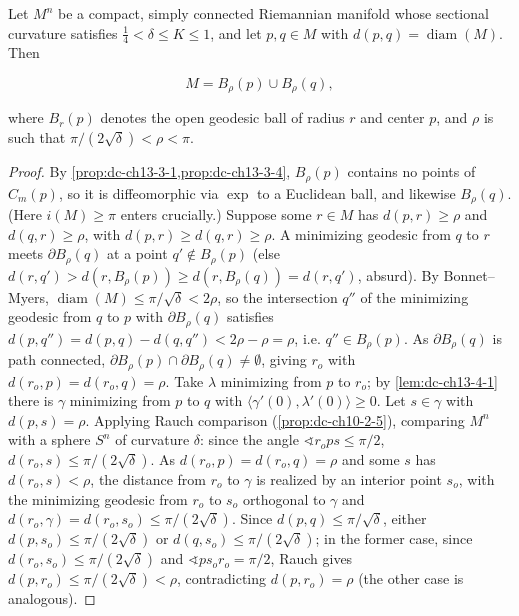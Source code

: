\begin{lemma}
  \label{lem:dc-ch13-4-2}
  Let $M^n$ be a compact, simply connected Riemannian manifold whose sectional
  curvature satisfies $\tfrac14<\delta\leq K\leq 1$, and let $p,q\in M$ with
  $d(p,q)=\operatorname{diam}(M)$. Then

  $$
  M=B_\rho(p)\cup B_\rho(q),
  $$

  where $B_r(p)$ denotes the open geodesic ball of radius $r$ and center $p$, and
  $\rho$ is such that $\pi/(2\sqrt\delta)<\rho<\pi$.
\end{lemma}
\begin{proof}
\sketch
  By \cref{prop:dc-ch13-3-1,prop:dc-ch13-3-4}, $B_\rho(p)$ contains no
  points of $C_m(p)$, so it is diffeomorphic via $\exp$ to a Euclidean ball, and
  likewise $B_\rho(q)$. (Here $i(M)\geq\pi$ enters crucially.) Suppose some $r\in M$
  has $d(p,r)\geq\rho$ and $d(q,r)\geq\rho$, with $d(p,r)\geq d(q,r)\geq\rho$. A
  minimizing geodesic from $q$ to $r$ meets $\partial B_\rho(q)$ at a point
  $q'\notin B_\rho(p)$ (else $d(r,q')>d(r,B_\rho(p))\geq d(r,B_\rho(q))=d(r,q')$,
  absurd). By Bonnet–Myers, $\operatorname{diam}(M)\leq\pi/\sqrt\delta<2\rho$, so the
  intersection $q''$ of the minimizing geodesic from $q$ to $p$ with $\partial B_\rho(q)$
  satisfies $d(p,q'')=d(p,q)-d(q,q'')<2\rho-\rho=\rho$, i.e. $q''\in B_\rho(p)$. As
  $\partial B_\rho(q)$ is path connected, $\partial B_\rho(p)\cap\partial B_\rho(q)\neq\emptyset$,
  giving $r_o$ with $d(r_o,p)=d(r_o,q)=\rho$. Take $\lambda$ minimizing from $p$ to
  $r_o$; by \cref{lem:dc-ch13-4-1} there is $\gamma$ minimizing from $p$ to $q$ with
  $\langle\gamma'(0),\lambda'(0)\rangle\geq0$. Let $s\in\gamma$ with $d(p,s)=\rho$.
  Applying Rauch comparison (\cref{prop:dc-ch10-2-5}), comparing $M^n$ with a
  sphere $S^n$ of curvature $\delta$: since the angle
  $\sphericalangle r_o p s\leq\pi/2$, $d(r_o,s)\leq\pi/(2\sqrt\delta)$. As
  $d(r_o,p)=d(r_o,q)=\rho$ and some $s$ has $d(r_o,s)<\rho$, the distance from $r_o$ to
  $\gamma$ is realized by an interior point $s_o$, with the minimizing geodesic from
  $r_o$ to $s_o$ orthogonal to $\gamma$ and
  $d(r_o,\gamma)=d(r_o,s_o)\leq\pi/(2\sqrt\delta)$. Since $d(p,q)\leq\pi/\sqrt\delta$,
  either $d(p,s_o)\leq\pi/(2\sqrt\delta)$ or $d(q,s_o)\leq\pi/(2\sqrt\delta)$; in the
  former case, since $d(r_o,s_o)\leq\pi/(2\sqrt\delta)$ and
  $\sphericalangle p s_o r_o=\pi/2$, Rauch gives $d(p,r_o)\leq\pi/(2\sqrt\delta)<\rho$,
  contradicting $d(p,r_o)=\rho$ (the other case is analogous).
\end{proof}

